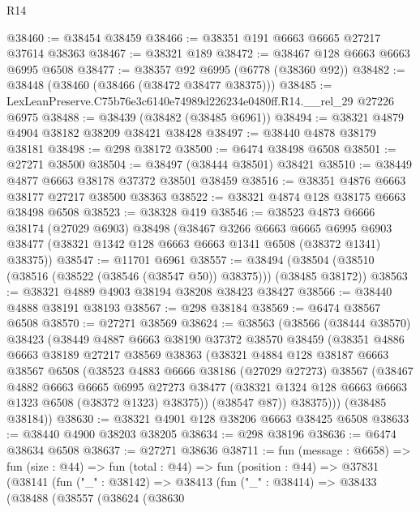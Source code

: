 \begin{lexlean}{R14}
\begin{coremodule}
@38460 := @38454 @38459
@38466 := @38351 @191 @6663 @6665 @27217 @37614 @38363
@38467 := @38321 @189
@38472 := @38467 @128 @6663 @6663 @6995 @6508
@38477 := @38357 @92 @6995 (@6778 (@38360 @92))
@38482 := @38448 (@38460 (@38466 (@38472 @38477 @38375)))
@38485 := LexLeanPreserve.C75b76e3c6140e74989d226234e0480ff.R14.__rel_29 @27226 @6975
@38488 := @38439 (@38482 (@38485 @6961))
@38494 := @38321 @4879 @4904 @38182 @38209 @38421 @38428
@38497 := @38440 @4878 @38179 @38181
@38498 := @298 @38172
@38500 := @6474 @38498 @6508
@38501 := @27271 @38500
@38504 := @38497 (@38444 @38501) @38421
@38510 := @38449 @4877 @6663 @38178 @37372 @38501 @38459
@38516 := @38351 @4876 @6663 @38177 @27217 @38500 @38363
@38522 := @38321 @4874 @128 @38175 @6663 @38498 @6508
@38523 := @38328 @419
@38546 := @38523
    @4873
    @6666
    @38174
    (@27029 @6903)
    @38498
    (@38467
      @3266
      @6663
      @6665
      @6995
      @6903
      @38477
      (@38321 @1342 @128 @6663 @6663 @1341 @6508 (@38372 @1341) @38375))
@38547 := @11701 @6961
@38557 := @38494 (@38504 (@38510 (@38516 (@38522 (@38546 (@38547 @50)) @38375))) (@38485 @38172))
@38563 := @38321 @4889 @4903 @38194 @38208 @38423 @38427
@38566 := @38440 @4888 @38191 @38193
@38567 := @298 @38184
@38569 := @6474 @38567 @6508
@38570 := @27271 @38569
@38624 := @38563
    (@38566
      (@38444 @38570)
      @38423
      (@38449
        @4887
        @6663
        @38190
        @37372
        @38570
        @38459
        (@38351
          @4886
          @6663
          @38189
          @27217
          @38569
          @38363
          (@38321
            @4884
            @128
            @38187
            @6663
            @38567
            @6508
            (@38523
              @4883
              @6666
              @38186
              (@27029 @27273)
              @38567
              (@38467
                @4882
                @6663
                @6665
                @6995
                @27273
                @38477
                (@38321 @1324 @128 @6663 @6663 @1323 @6508 (@38372 @1323) @38375))
              (@38547 @87))
            @38375)))
      (@38485 @38184))
@38630 := @38321 @4901 @128 @38206 @6663 @38425 @6508
@38633 := @38440 @4900 @38203 @38205
@38634 := @298 @38196
@38636 := @6474 @38634 @6508
@38637 := @27271 @38636
@38711 := fun (message : @6658) =>
  fun (size : @44) =>
  fun (total : @44) =>
  fun (position : @44) =>
  @37831
    (@38141
      (fun ("_" : @38142) =>
      @38413
        (fun ("_" : @38414) =>
        @38433
          (@38488
            (@38557
              (@38624
                (@38630

\end{coremodule}
\end{lexlean}
